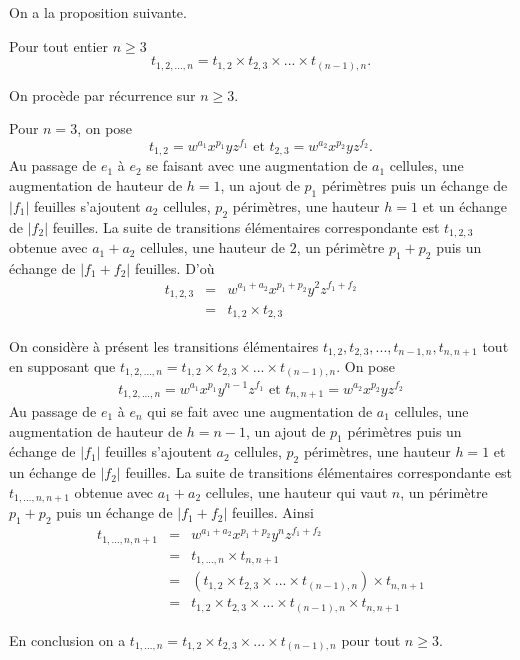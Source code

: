  On a la proposition suivante.
\begin{Prop} \label{prop8}
Pour tout entier $n\geq 3$
$$t_{1,2,...,n}= t_{1,2}\times t_{2,3}\times...\times t_{(n-1),n}. $$
\end{Prop}
\begin{Pre}
On procède par récurrence sur $n\geq 3$.

Pour $n=3$, on pose 
$$ t_{1,2}= w^{a_{1}}x^{p_{1}}yz^{f_{1}} \text{ et } t_{2,3}= w^{a_{2}}x^{p_{2}}yz^{ f_{2}}.$$
Au passage de $e_{1}$ à $e_{2}$ se faisant avec une augmentation de $a_{1}$ cellules, une augmentation de hauteur de $h=1$, un ajout de $p_{1}$ périmètres puis un échange de $\vert f_{1}\vert$  feuilles s'ajoutent $a_{2}$ cellules, $p_{2}$ périmètres, une hauteur $h=1$ et un échange de $\vert f_{2}\vert$ feuilles.
La suite de transitions élémentaires correspondante est   $t_{1,2,3}$  obtenue avec  $a_{1}+a_{2}$ cellules, une  hauteur  de $2$, un   périmètre  $p_{1}+p_{2}$  puis un échange de   $\vert f_{1}+f_{2}\vert$ feuilles. D'où
\begin{eqnarray*}
t_{1,2,3} & = & w^{a_{1}+a_{2}}x^{p_{1}+p_{2}}y^{2}z^{f_{1}+f_{2}}\\
& = & t_{1,2}\times t_{2,3}
\end{eqnarray*}

On considère à présent les transitions élémentaires $t_{1,2}, t_{2,3},...,t_{n-1,n}, t_{n,n+1}$  tout en supposant que $t_{1,2,...,n}= t_{1,2}\times t_{2,3}\times...\times t_{(n-1),n}$. On pose 
\begin{eqnarray*}
t_{1,2,...,n}= w^{a_{1}}x^{p_{1}}y^{n-1}z^{f_{1}} \text{ et } t_{n,n+1}= w^{a_{2}}x^{p_{2}}yz^{ f_{2}}
\end{eqnarray*}
Au passage de $e_{1}$ à $e_{n}$ qui se fait avec une augmentation de $a_{1}$ cellules, une augmentation de hauteur de $h=n-1$, un ajout  de $p_{1}$ périmètres puis un échange de $\vert f_{1}\vert$  feuilles s'ajoutent $a_{2}$ cellules, $p_{2}$ périmètres, une hauteur $h=1$ et un échange de $\vert f_{2}\vert$ feuilles.
La suite de transitions élémentaires correspondante est   $t_{1,...,n,n+1}$  obtenue avec  $a_{1}+a_{2}$ cellules, une  hauteur qui vaut $n$, un périmètre   $p_{1}+p_{2}$ puis un échange de   $\vert f_{1}+f_{2}\vert$ feuilles. Ainsi 
\begin{eqnarray*}
t_{1,...,n,n+1} & = & w^{a_{1}+a_{2}}x^{p_{1}+p_{2}}y^{n}z^{f_{1}+f_{2}}\\
& = & t_{1,...,n}\times t_{n,n+1}\\
&=& (t_{1,2}\times t_{2,3}\times...\times t_{(n-1),n})\times t_{n,n+1}\\
&=& t_{1,2}\times t_{2,3}\times...\times t_{(n-1),n}\times t_{n,n+1}
\end{eqnarray*}

En conclusion on a $t_{1,...,n}=t_{1,2}\times t_{2,3}\times...\times t_{(n-1),n}$ pour tout $n\geq 3$.
\end{Pre}

